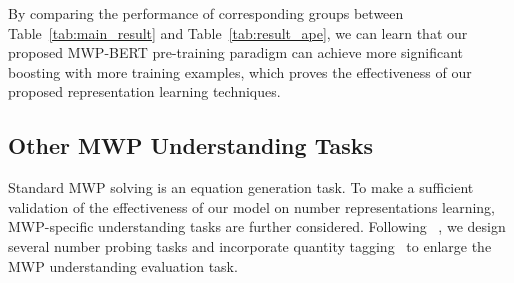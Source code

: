 \documentclass[11pt]{article}
\begin{document}
By comparing the performance of corresponding groups between Table~\ref{tab:main_result} and Table~\ref{tab:result_ape}, we can learn that our proposed MWP-BERT pre-training paradigm can achieve more significant boosting with more training examples, which proves the effectiveness of our proposed representation learning techniques.



\begin{table*}[t]
\renewcommand\arraystretch{1.1}
\centering
{}
\caption{The evaluation results on MWP-specific understanding tasks. All tasks correspond to the tasks mentioned in section~\ref{tab:result_probing}. Note that the metric for 2 tasks is mean-squared-error, while others use classification accuracy. ``QT'' stands for quantity tagging.}
\label{tab:result_probing}
\end{table*} \subsection{Other MWP Understanding Tasks}\label{experiment:mwpprobing}
Standard MWP solving is an equation generation task. To make a sufficient validation of the effectiveness of our model on number representations learning,  MWP-specific understanding tasks are  further considered. Following ~\citet{DBLP:conf/naacl/HewittM19,DBLP:conf/emnlp/WallaceWLSG19}, we design several number probing tasks and incorporate quantity tagging~\cite{zou2019text2math} to enlarge the MWP understanding evaluation task. 
\end{document}
